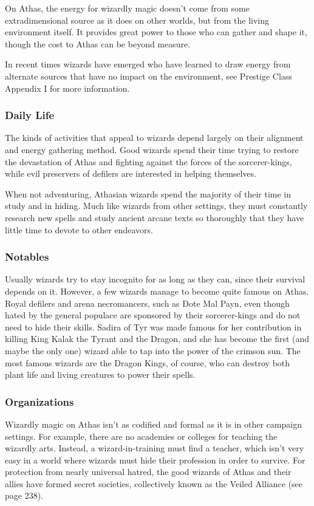 On Athas, the energy for wizardly magic doesn't come from some extradimensional source as it does on other worlds, but from the living environment itself. It provides great power to those who can gather and shape it, though the cost to Athas can be beyond measure.

In recent times wizards have emerged who have learned to draw energy from alternate sources that have no impact on the environment, see Prestige Class Appendix I for more information.

\subsubsection{Daily Life}
The kinds of activities that appeal to wizards depend largely on their alignment and energy gathering method. Good wizards spend their time trying to restore the devastation of Athas and fighting against the forces of the sorcerer-kings, while evil preservers of defilers are interested in helping themselves.

When not adventuring, Athasian wizards spend the majority of their time in study and in hiding. Much like wizards from other settings, they must constantly research new spells and study ancient arcane texts so thoroughly that they have little time to devote to other endeavors.

\subsubsection{Notables}
Usually wizards try to stay incognito for as long as they can, since their survival depends on it. However, a few wizards manage to become quite famous on Athas. Royal defilers and arena necromancers, such as Dote Mal Payn, even though hated by the general populace are sponsored by their sorcerer-kings and do not need to hide their skills. Sadira of Tyr was made famous for her contribution in killing King Kalak the Tyrant and the Dragon, and she has become the first (and maybe the only one) wizard able to tap into the power of the crimson sun. The most famous wizards are the Dragon Kings, of course, who can destroy both plant life and living creatures to power their spells.

\subsubsection{Organizations}
Wizardly magic on Athas isn't as codified and formal as it is in other campaign settings. For example, there are no academies or colleges for teaching the wizardly arts. Instead, a wizard-in-training must find a teacher, which isn't very easy in a world where wizards must hide their profession in order to survive. For protection from nearly universal hatred, the good wizards of Athas and their allies have formed secret societies, collectively known as the Veiled Alliance (see page 238).

